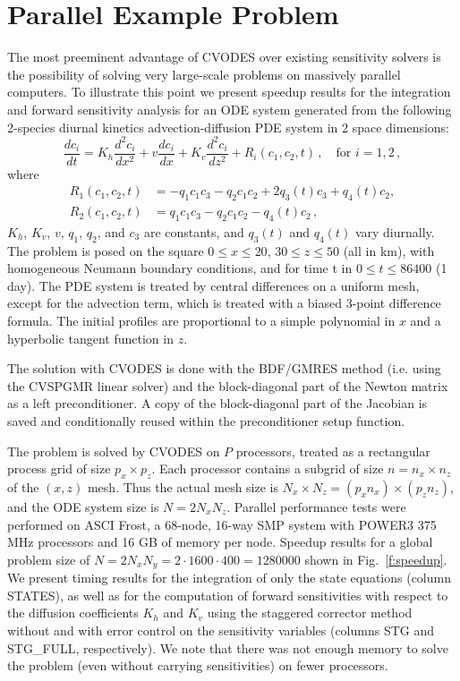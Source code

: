 \section{Parallel  Example Problem}\label{s:parallel}

The most preeminent advantage of CVODES over existing sensitivity solvers is
the possibility of solving very large-scale problems on massively parallel 
computers. To illustrate this point we present speedup results for the 
integration and forward sensitivity analysis for
an ODE system generated from the following 2-species diurnal
kinetics advection-diffusion PDE system in 2 space dimensions: 
\begin{equation}
  \frac{dc_i}{dt} = K_h \frac{d^2c_i}{dx^2} + v \frac{dc_i}{dx} 
  + K_v \frac{d^2c_i}{dz^2}
  + R_i(c_1, c_2, t) \, , \quad \text{for } i=1,2 \, ,
\end{equation}
where
\begin{equation}
  \begin{split}
    R_1(c_1,c_2,t) &= -q_1 c_1 c_3 - q_2 c_1 c_2 + 2 q_3(t) c_3 + q_4(t) c_2 , \\
    R_2(c_1,c_2,t) &=  q_1 c_1 c_3 - q_2 c_1 c_2 - q_4(t) c_2 \, ,
  \end{split}
\end{equation}
$K_h$, $K_v$, $v$, $q_1$, $q_2$, and $c_3$ are constants, and $q_3(t)$ and $q_4(t)$
vary diurnally.   
The problem is posed on the square
$0 \le x \le 20$, $30 \le z \le 50$   (all in km),
with homogeneous Neumann boundary conditions, and for time t in
$0 \le t \le 86400$ (1 day).
The PDE system is treated by central differences on a uniform
mesh, except for the advection term, which is treated with a biased
3-point difference formula.
The initial profiles are proportional to a simple polynomial in $x$
and a hyperbolic tangent function in $z$.

The solution with CVODES is done with the BDF/GMRES method (i.e.
using the CVSPGMR linear solver) and the block-diagonal part of the 
Newton matrix as a left preconditioner. A copy of the block-diagonal
part of the Jacobian is saved and conditionally reused within the
preconditioner setup function.

The problem is solved by CVODES on $P$ processors, treated as a 
rectangular process grid of size $p_x \times p_z$.
Each processor contains a subgrid of size $n = n_x \times n_z$ of the 
$(x,z)$ mesh.  Thus the actual mesh size is 
$N_x \times N_z = (p_x n_x) \times (p_z n_z)$,
and the ODE system size is $N = 2 N_x N_z$.
Parallel performance tests were performed on ASCI Frost, a 68-node, 16-way SMP system
with POWER3 375 MHz processors and 16 GB of memory per node.
Speedup results for a global problem size of
$N = 2 N_x N_y = 2 \cdot 1600 \cdot 400 = 1280000$ 
shown in Fig.~\ref{f:speedup}.
We present timing results for the integration of only the state equations
(column STATES), as well as for
the computation of forward sensitivities with respect to the diffusion coefficients
$K_h$ and $K_v$ using the staggered corrector method without and with 
error control on the sensitivity variables (columns STG and
STG\_FULL, respectively). 
We note that there was not enough memory to solve the problem (even without
carrying sensitivities) on fewer processors.

